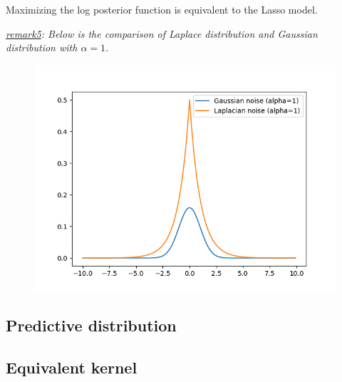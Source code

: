 \documentclass{article}
\begin{document}
Maximizing the log posterior function is equivalent to the Lasso model.

	\textit{\underline{remark5}: Below is the comparison of Laplace distribution and Gaussian distribution with $\alpha=1$.}
	\begin{figure}[!htbp]
	\begin{center}
	\includegraphics[scale=.4]{C4-1.png}	
	\end{center}
	\end{figure}
	
	\subsection{Predictive distribution}
	
	\subsection{Equivalent kernel}
\end{document}
